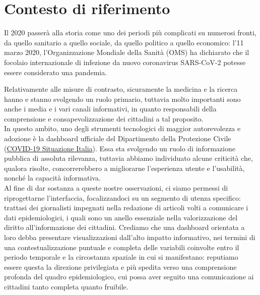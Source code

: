 \documentclass[../../main.tex]{subfiles}
\begin{document}
\section{Contesto di riferimento}
Il 2020 passerà alla storia come uno dei periodi più complicati su numerosi fronti, da quello sanitario a quello sociale, da quello politico a quello economico: l'11 marzo 2020, l'Organizzazione Mondiale della Sanità (OMS) ha dichiarato che il focolaio internazionale di infezione da nuovo coronavirus SARS-CoV-2 potesse essere considerato una pandemia.

Relativamente alle misure di contrasto, sicuramente la medicina e la ricerca hanno e stanno svolgendo un ruolo primario, tuttavia molto importanti sono anche i media e i vari canali informativi, in quanto responsabili della comprensione e consapevolizzazione dei cittadini a tal proposito.\\
In questo ambito, uno degli strumenti tecnologici di maggior autorevolezza e adozione è la dashboard ufficiale del Dipartimento della Protezione Civile (\href{https://opendatadpc.maps.arcgis.com/apps/opsdashboard/index.html#/b0c68bce2cce478eaac82fe38d4138b1}{COVID-19 Situazione Italia}). Essa sta svolgendo un ruolo di informazione pubblica di assoluta rilevanza, tuttavia abbiamo individuato alcune criticità che, qualora risolte, concorrerebbero a migliorarne l'esperienza utente e l'usabilità, nonché la capacità informativa.\\
Al fine di dar sostanza a queste nostre osservazioni, ci siamo permessi di riprogettarne l'interfaccia, focalizzandoci su un segmento di utenza specifico: trattasi dei giornalisti impegnati nella redazione di articoli volti a comunicare i dati epidemiologici, i quali sono un anello essenziale nella valorizzazione del diritto all'informazione dei cittadini.
Crediamo che una dashboard orientata a loro debba presentare visualizzazioni dall'alto impatto informativo, nei termini di una contestualizzazione puntuale e completa delle variabili coinvolte entro il periodo temporale e la circostanza spaziale in cui si manifestano: reputiamo essere questa la direzione privilegiata e più spedita verso una comprensione profonda del quadro epidemiologico, cui possa aver seguito una comunicazione ai cittadini tanto completa quanto fruibile.
\end{document}
